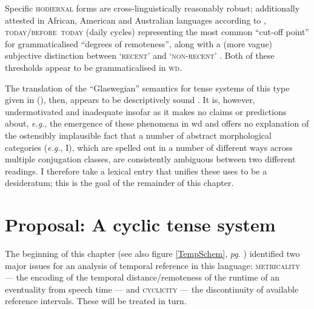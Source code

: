 
Specific \textsc{hodiernal} forms are cross-linguistically reasonably robust; additionally attested in African, American and Australian languages according to \citet[87]{Comrie1985}, \textsc{today/before~today} (daily cycles) representing the most common ``cut-off point'' for grammaticalised ``degrees of remoteness'', along with a (more vague) subjective distinction between `\textsc{recent}' and \textsc{`non-recent'} \citep[see also][]{Botne2012}. Both of these thresholds appear to be grammaticalised in \textsc{wd}.

The translation of the ``Glaswegian'' semantics for tense systems of this type given in (), then, appears to be descriptively sound \citep[\textit{i.e.}, the analysis in][]{Glasgow1964}. It is, however, undermotivated and inadequate insofar as it makes no claims or predictions about, \textit{e.g.}, the emergence of these phenomena in \gls{wd} and offers no explanation of the ostensibly implausible fact that a number of abstract morphological categories (\textit{e.g.}, \gls{I}), which are spelled out in a number of different ways across multiple conjugation classes, are consistently ambiguous between two different readings. I therefore take a lexical entry that unifies these uses to be a desideratum; this is the goal of the remainder of this chapter.

\section{Proposal: A cyclic tense system}\label{sec:cyc}

The beginning of this chapter (see also figure \ref{TempSchem}, \textit{pg.} \pageref{TempSchem}) identified two major issues for an analysis of temporal reference in this language: \textsc{metricality} --- the encoding of the temporal distance/remoteness of the runtime of an eventuality from speech time  --- and \textsc{cyclicity} --- the discontinuity of available reference intervals. These will be treated in turn.

